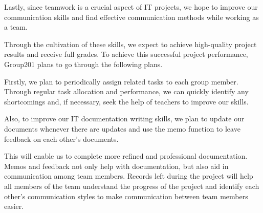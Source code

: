 \documentclass{article}
\begin{document}
Lastly, since teamwork is a crucial aspect of IT projects, we hope to improve our communication skills and find effective communication methods while working as a team.



Through the cultivation of these skills, we expect to achieve high-quality project results and receive full grades. To achieve this successful project performance, Group201 plans to go through the following plans.



Firstly, we plan to periodically assign related tasks to each group member. Through regular task allocation and performance, we can quickly identify any shortcomings and, if necessary, seek the help of teachers to improve our skills.



Also, to improve our IT documentation writing skills, we plan to update our documents whenever there are updates and use the memo function to leave feedback on each other's documents.



This will enable us to complete more refined and professional documentation. Memos and feedback not only help with documentation, but also aid in communication among team members. Records left during the project will help all members of the team understand the progress of the project and identify each other's communication styles to make communication between team members easier.
\end{document}
